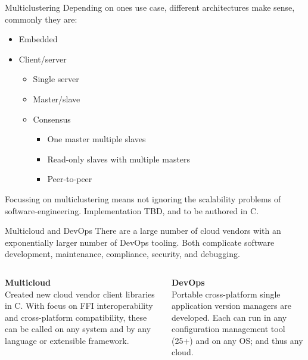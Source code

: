 \documentclass[aspectratio=169,xcolor=dvipsnames]{beamer}
\begin{document}
\begin{frame}{Multiclustering}
	Depending on ones use case, different architectures make sense, commonly they are:
	\begin{itemize}
		\item Embedded
		\item Client/server
		      \begin{itemize}
			      \item Single server
			      \item Master/slave
			      \item Consensus
			            \begin{itemize}
				            \item One master multiple slaves
				            \item Read-only slaves with multiple masters
				            \item Peer-to-peer
			            \end{itemize}
		      \end{itemize}
	\end{itemize}

	Focussing on multiclustering means not ignoring the scalability problems of software-engineering. Implementation TBD, and to be authored in C.
\end{frame}

\begin{frame}{Multicloud and DevOps}
	There are a large number of cloud vendors with an exponentially larger number of DevOps tooling. Both complicate software development, maintenance, compliance, security, and debugging.\vspace{1em}

	\begin{columns}[t]
		\begin{column}[T]{0.4\textwidth}
			\textbf{Multicloud}\\
			Created new cloud vendor client libraries in C. With focus on FFI interoperability and cross-platform compatibility, these can be called on any system and by any language or extensible framework.
		\end{column}
		\begin{column}[T]{0.4\textwidth}
			\textbf{DevOps}\\
			Portable cross-platform single application version managers are developed. Each can run in any configuration management tool (25+) and on any OS; and thus any cloud.
		\end{column}
	\end{columns}
\end{frame}
\end{document}
